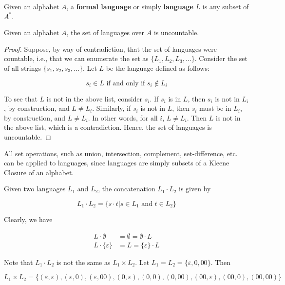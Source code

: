 \begin{definition}
 Given an alphabet \(A\), a \textbf{formal language} or simply \textbf{language} \(L\) is any subset of \(A^*\). 
\end{definition}

\begin{theorem}
 Given an alphabet \(A\), the set of languages over \(A\) is uncountable. 
\end{theorem}

\begin{proof}
 Suppose, by way of contradiction, that the set of languages were countable, i.e., that we can enumerate the set as \(\{L_1, L_2, L_3, \hdots\}\). Consider the set of all strings \(\{s_1, s_2, s_3, \hdots\}\). Let \(L\) be the language defined as follows: 
 
\[s_i\in L\text{ if and only if } s_i\not\in L_i\]

 To see that \(L\) is not in the above list, consider \(s_i\). If \(s_i\) is in \(L\), then \(s_i\) is not in \(L_i\), by construction, and \(L\neq L_i\). Similarly, if \(s_i\) is not in \(L\), then \(s_i\) must be in \(L_i\), by construction, and \(L\neq L_i\). In other words, for all \(i\), \(L\neq L_i\). Then \(L\) is not in the above list, which is a contradiction. Hence, the set of languages is uncountable. 
\end{proof}

All set operations, such as union, intersection, complement, set-difference, etc. can be applied to languages, since languages are simply subsets of a Kleene Closure of an alphabet.

\begin{definition}
 Given two languages \(L_1\) and \(L_2\), the concatenation \(L_1\cdot L_2\) is given by
 
 \[L_1\cdot L_2=\{s\cdot t|s\in L_1\text{ and } t\in L_2\}\]
\end{definition}

Clearly, we have 

\begin{align*}
    L\cdot\emptyset &= \emptyset = \emptyset\cdot L\\
    L\cdot\{\varepsilon\} &= L = \{\varepsilon\}\cdot L
\end{align*}

Note that \(L_1\cdot L_2\) is not the same as \(L_1\times L_2\). Let \(L_1=L_2=\{\varepsilon, 0, 00\}\). Then

\[L_1\times L_2=\{(\varepsilon, \varepsilon), (\varepsilon, 0), (\varepsilon, 00), (0, \varepsilon), (0, 0), (0, 00), (00, \varepsilon), (00, 0), (00, 00)\}\]

